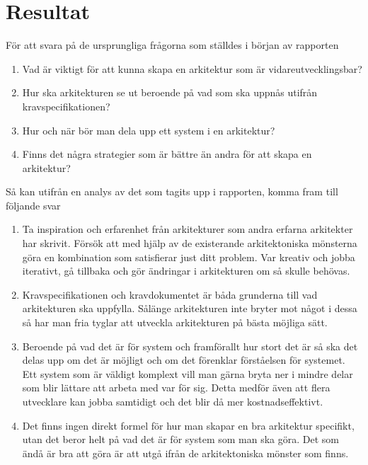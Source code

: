\section{Resultat}
För att svara på de ursprungliga frågorna som ställdes i början av rapporten

\begin{enumerate}
	\item Vad är viktigt för att kunna skapa en arkitektur som är vidareutvecklingsbar?
	\item Hur ska arkitekturen se ut beroende på vad som ska uppnås utifrån kravspecifikationen?
	\item Hur och när bör man dela upp ett system i en arkitektur?
	\item Finns det några strategier som är bättre än andra för att skapa en arkitektur?
\end{enumerate}Så kan utifrån en analys av det som tagits upp i rapporten, komma fram till följande svar

\begin{enumerate}
	\item Ta inspiration och erfarenhet från arkitekturer som andra erfarna arkitekter har skrivit. Försök att med hjälp av de existerande arkitektoniska mönsterna göra en kombination som satisfierar just ditt problem. Var kreativ och jobba iterativt, gå tillbaka och gör ändringar i arkitekturen om så skulle behövas.
	\item Kravspecifikationen och kravdokumentet är båda grunderna till vad arkitekturen ska uppfylla. Sålänge arkitekturen inte bryter mot något i dessa så har man fria tyglar att utveckla arkitekturen på bästa möjliga sätt.
	\item Beroende på vad det är för system och framförallt hur stort det är så ska det delas upp om det är möjligt och om det förenklar förståelsen för systemet. Ett system som är väldigt komplext vill man gärna bryta ner i mindre delar som blir lättare att arbeta med var för sig. Detta medför även att flera utvecklare kan jobba samtidigt och det blir då mer kostnadseffektivt.
	\item Det finns ingen direkt formel för hur man skapar en bra arkitektur specifikt, utan det beror helt på vad det är för system som man ska göra. Det som ändå är bra att göra är att utgå ifrån de arkitektoniska mönster som finns.
\end{enumerate}
